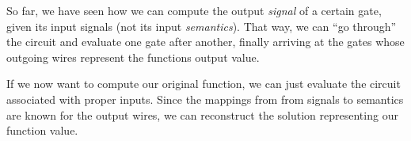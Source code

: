 So far, we have seen how we can compute the output \emph{signal} of a certain gate, given its input signals (not its input \emph{semantics}). That way, we can ``go through'' the circuit and evaluate one gate after another, finally arriving at the gates whose outgoing wires represent the functions output value.

If we now want to compute our original function, we can just evaluate the circuit associated with proper inputs. Since the mappings from from signals to semantics are known for the output wires, we can reconstruct the solution representing our function value.

